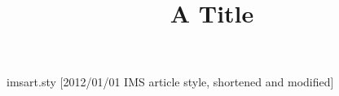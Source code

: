 \begin{filecontents*}{imsart.sty}
[2012/01/01 IMS article style, shortened and modified]
\DeclareRobustCommand\ead[2][label= ,email]{ {\ttfamily #2}}
\def\author{\@ifnextchar[{\author@fmt}{\author@fmt[]}}
\def\author@fmt[#1]#2{\bgroup\def\fnms##1{##1}\def\snm##1{##1}\noindent#2\egroup\par}
\end{filecontents*}
\documentclass{article}
\usepackage{imsart}

\title{A Title}
\author{ }
Body.

